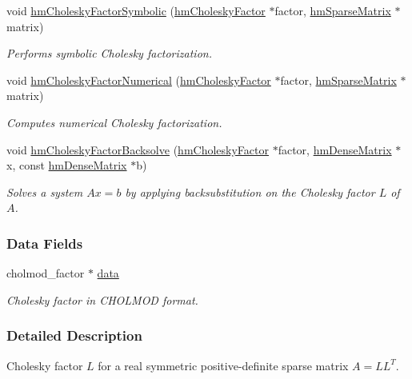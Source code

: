 \begin{DoxyCompactItemize}
void \hyperlink{structhm_cholesky_factor_a04ecfa1b1b701cf950eb527b9d27001c}{hm\-Cholesky\-Factor\-Symbolic} (\hyperlink{structhm_cholesky_factor}{hm\-Cholesky\-Factor} $\ast$factor, \hyperlink{structhm_sparse_matrix}{hm\-Sparse\-Matrix} $\ast$matrix)
\begin{DoxyCompactList}\small\item\em Performs symbolic Cholesky factorization. \end{DoxyCompactList}\item 
void \hyperlink{structhm_cholesky_factor_a543e36da6914329c6e102e64d41d7625}{hm\-Cholesky\-Factor\-Numerical} (\hyperlink{structhm_cholesky_factor}{hm\-Cholesky\-Factor} $\ast$factor, \hyperlink{structhm_sparse_matrix}{hm\-Sparse\-Matrix} $\ast$matrix)
\begin{DoxyCompactList}\small\item\em Computes numerical Cholesky factorization. \end{DoxyCompactList}\item 
void \hyperlink{structhm_cholesky_factor_a60a8b00fb422f4aa9116ed9644236301}{hm\-Cholesky\-Factor\-Backsolve} (\hyperlink{structhm_cholesky_factor}{hm\-Cholesky\-Factor} $\ast$factor, \hyperlink{structhm_dense_matrix}{hm\-Dense\-Matrix} $\ast$x, const \hyperlink{structhm_dense_matrix}{hm\-Dense\-Matrix} $\ast$b)
\begin{DoxyCompactList}\small\item\em Solves a system $Ax=b$ by applying backsubstitution on the Cholesky factor $L$ of $A$. \end{DoxyCompactList}\end{DoxyCompactItemize}
\subsubsection*{Data Fields}
\begin{DoxyCompactItemize}
\item 
cholmod\-\_\-factor $\ast$ \hyperlink{structhm_cholesky_factor_a250b811bd821fb2bd729fe56388e6f76}{data}
\begin{DoxyCompactList}\small\item\em Cholesky factor in C\-H\-O\-L\-M\-O\-D format. \end{DoxyCompactList}\end{DoxyCompactItemize}


\subsubsection{Detailed Description}
Cholesky factor $L$ for a real symmetric positive-\/definite sparse matrix $A = LL^T$. 



